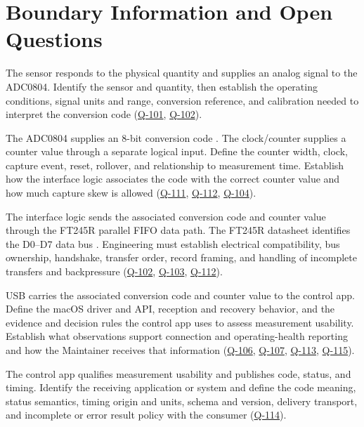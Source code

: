 \section{Boundary Information and Open Questions}
\label{Section:ContextBoundaryInformation}
\begin{description}[leftmargin=0pt,labelindent=0pt,labelsep=0pt,style=nextline]
\item[Physical quantity to sensor to ADC0804.]
The sensor responds to the physical quantity and supplies an analog signal
to the ADC0804. Identify the sensor and quantity, then establish the
operating conditions, signal units and range, conversion reference, and
calibration needed to interpret the conversion code
(\hyperref[Question:Q-101]{Q-101}, \hyperref[Question:Q-102]{Q-102}).

\item[ADC0804 and clock/counter to interface logic.]
The ADC0804 supplies an 8-bit conversion code \cite{ADC0804Datasheet}.
The clock/counter supplies a counter value through a separate logical input.
Define the counter width, clock, capture event, reset, rollover, and
relationship to measurement time. Establish how the interface logic associates
the code with the correct counter value and how much capture skew is allowed
(\hyperref[Question:Q-111]{Q-111}, \hyperref[Question:Q-112]{Q-112},
\hyperref[Question:Q-104]{Q-104}).

\item[Interface logic to FT245R.]
The interface logic sends the associated conversion code and counter value
through the FT245R parallel FIFO data path. The FT245R datasheet identifies
the D0--D7 data bus \cite{FT245RDatasheet}. Engineering must establish
electrical compatibility, bus ownership, handshake, transfer order,
record framing, and handling of incomplete transfers and backpressure
(\hyperref[Question:Q-102]{Q-102}, \hyperref[Question:Q-103]{Q-103},
\hyperref[Question:Q-112]{Q-112}).

\item[FT245R to control app.]
USB carries the associated conversion code and counter value to the control
app. Define the macOS driver and API, reception and recovery behavior, and
the evidence and decision rules the control app uses to assess measurement
usability. Establish what observations support connection and operating-health
reporting and how the Maintainer receives that information
(\hyperref[Question:Q-106]{Q-106}, \hyperref[Question:Q-107]{Q-107},
\hyperref[Question:Q-113]{Q-113}, \hyperref[Question:Q-115]{Q-115}).

\item[Control app to downstream consumer.]
The control app qualifies measurement usability and publishes code, status,
and timing. Identify the receiving application or system and define the code
meaning, status semantics, timing origin and units, schema and version,
delivery transport, and incomplete or error result policy with the consumer
(\hyperref[Question:Q-114]{Q-114}).
\end{description}

